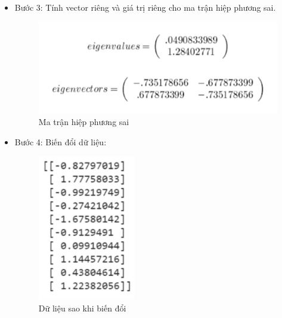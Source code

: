\documentclass[a4paper, 12pt]{article}
\begin{document}
\begin{itemize}
    \item Bước 3: Tính vector riêng và giá trị riêng cho ma trận hiệp phương sai.
    \begin{figure}[H]
        \begin{center}
            \includegraphics[scale=0.5]{img/PCA-cal-3}
            \caption{Ma trận hiệp phương sai}
        \end{center}
    \end{figure}
    
    \item Bước 4: Biến đổi dữ liệu:
    \begin{figure}[H]
        \begin{center}
            \includegraphics[scale=0.5]{img/PCA-cal-4}
            \caption{Dữ liệu sao khi biến đổi}
        \end{center}
    \end{figure}
\end{itemize}
\end{document}
